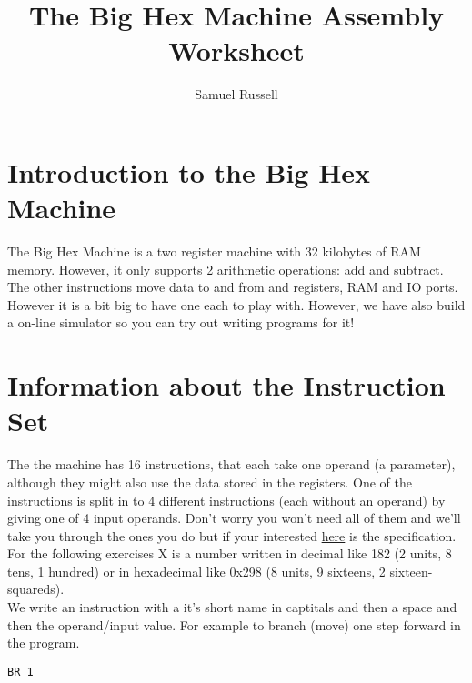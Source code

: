 \documentclass[10pt,a4paper]{article}
\author{Samuel Russell}
\title{The Big Hex Machine Assembly Worksheet}
\begin{document}
\maketitle

\section{Introduction to the Big Hex Machine}
The Big Hex Machine is a two register machine with 32 kilobytes of RAM memory. However, it only supports 2 arithmetic operations: add and subtract. The other instructions move data to and from and registers, RAM and IO ports. However it is a bit big to have one each to play with. However, we have also build a on-line simulator so you can try out writing programs for it!

\section{Information about the Instruction Set}
The the machine has 16 instructions, that each take one operand (a parameter), although they might also use the data stored in the registers. One of the instructions is split in to 4 different instructions (each without an operand) by giving one of 4 input operands. Don't worry you won't need all of them and we'll take you through the ones you do but if your interested \href{https://bighexmachine.github.io/BigHexOnlineSimulator/assemblySpec.pdf}{here} is the specification.\\

For the following exercises X is a number written in decimal like 182 (2 units, 8 tens, 1 hundred) or in hexadecimal like 0x298 (8 units, 9 sixteens, 2 sixteen-squareds).\\

We write an instruction with a it's short name in captitals and then a space and then the operand/input value. For example to branch (move) one step forward in the program.
\begin{lstlisting}[frame=single]
BR 1
\end{lstlisting}
\end{document}
